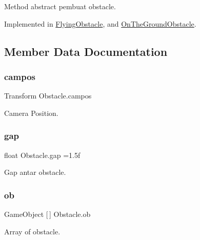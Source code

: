 Method abstract pembuat obstacle. 



Implemented in \hyperlink{class_flying_obstacle_a1c21c97ab8d9efa1c120103a2cd5cb34}{Flying\+Obstacle}, and \hyperlink{class_on_the_ground_obstacle_a6c6123b29a6d6c2b78fa12ff72bf0834}{On\+The\+Ground\+Obstacle}.



\subsection{Member Data Documentation}
\hypertarget{class_obstacle_ad1f3a9f914fb5fbe9367143d8d20ed67}{}\label{class_obstacle_ad1f3a9f914fb5fbe9367143d8d20ed67} 
\subsubsection{\texorpdfstring{campos}{campos}}
{\footnotesize\ttfamily Transform Obstacle.\+campos}



Camera Position. 

\hypertarget{class_obstacle_a84513c71d850ac7c67915fcee2d3df1b}{}\label{class_obstacle_a84513c71d850ac7c67915fcee2d3df1b} 
\subsubsection{\texorpdfstring{gap}{gap}}
{\footnotesize\ttfamily float Obstacle.\+gap =1.\+5f}



Gap antar obstacle. 

\hypertarget{class_obstacle_a388c8e33dc5a1378f622c048891d0306}{}\label{class_obstacle_a388c8e33dc5a1378f622c048891d0306} 
\subsubsection{\texorpdfstring{ob}{ob}}
{\footnotesize\ttfamily Game\+Object \mbox{[}$\,$\mbox{]} Obstacle.\+ob}



Array of obstacle. 

\hypertarget{class_obstacle_a079bd35101bc96d528ef7246f28de6ea}{}\label{class_obstacle_a079bd35101bc96d528ef7246f28de6ea} 
